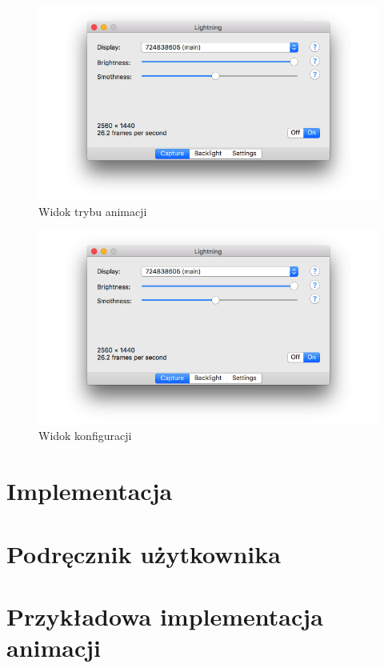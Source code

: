 \documentclass[12pt]{report}
\begin{document}
\begin{figure}[h]
\centering
\includegraphics[width=\textwidth]{../resources/capture.png}
\caption{Widok trybu animacji}
\end{figure}

\begin{figure}[h]
\centering
\includegraphics[width=\textwidth]{../resources/capture.png}
\caption{Widok konfiguracji}
\end{figure}

\section{Implementacja}


\section{Podręcznik użytkownika}


\section{Przykładowa implementacja animacji}
\end{document}
